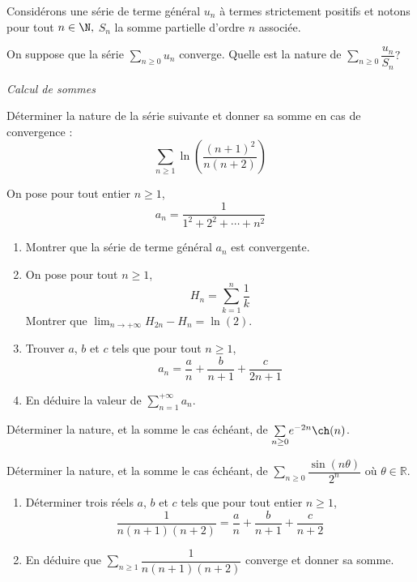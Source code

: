 \documentclass[a4paper,twoside,french,11pt]{VcCours}
\newcommand{\Sum}[2]{\ensuremath{\textstyle{\sum\limits_{#1}^{#2}}}}
\begin{document}
\begin{Exercice} Considérons une série de terme général $u_n$ à termes strictement positifs et notons pour tout $n\in\N,$ $S_n$ la somme partielle d'ordre $n$ associée. 

On suppose que la série $\Sum{n \geq 0}{} u_n$ converge. Quelle est la nature de $\Sum{n \geq 0}{} \dfrac{u_n}{S_n}?$
\end{Exercice}



\medskip

\begin{center}
\textit{{ {\large Calcul de sommes}}}
\end{center}

\medskip

\begin{Exercice} Déterminer la nature de la série suivante et donner sa somme en cas de convergence : 
$$ \sum_{n \geq 1} \ln \left( \frac{(n+1)^2}{n(n+2)}\right)$$
\end{Exercice}

\begin{Exercice} On pose pour tout entier $n \geq 1$,
$$ a_n = \dfrac{1}{1^2+2^2 + \cdots + n^2}$$
\begin{enumerate}
\item Montrer que la série de terme général $a_n$ est convergente.
\item On pose pour tout $n \geq 1$,
$$ H_n = \sum_{k=1}^n \dfrac{1}{k}$$
Montrer que $\lim_{n \rightarrow + \infty} H_{2n}-H_n = \ln(2)$.
\item Trouver $a$, $b$ et $c$ tels que pour tout $n \geq 1$,
$$ a_n = \dfrac{a}{n} + \dfrac{b}{n+1} + \dfrac{c}{2n+1}$$
\item En déduire la valeur de $\sum_{n=1}^{+ \infty} a_n$.
\end{enumerate}
\end{Exercice}


\begin{Exercice} Déterminer la nature, et la somme le cas échéant, de $\Sum{n \geq 0}{} e^{-2n} \ch(n)$.
\end{Exercice}

\begin{Exercice} Déterminer la nature, et la somme le cas échéant, de $\Sum{n \geq 0}{} \dfrac{\sin(n \theta)}{2^n}$ où $\theta \in \mathbb{R}$.
\end{Exercice}


\begin{Exercice} 
\begin{enumerate}
\item Déterminer trois réels $a$, $b$ et $c$ tels que pour tout entier $n \geq 1$,
$$ \frac{1}{n(n+1)(n+2)} = \frac{a}{n} + \frac{b}{n+1} + \frac{c}{n+2}$$
\item En déduire que $\Sum{n \geq 1}{} \dfrac{1}{n(n+1)(n+2)}$ converge et donner sa somme.
\end{enumerate}
\end{Exercice}
\end{document}
